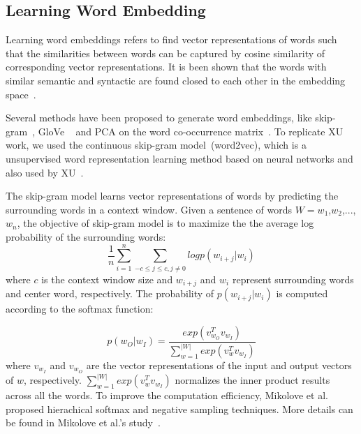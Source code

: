 \documentclass[sigconf]{acmart}
\theoremstyle{break}
\begin{document}


\subsection{Learning Word Embedding}\label{embedding}
Learning word embeddings refers to find vector representations
of words such that the similarities between words can be captured by cosine similarity of corresponding 
vector representations. It is been shown that the words with similar semantic and syntactic are found closed
to each other in the embedding space~\cite{mikolov2013distributed}.

Several methods have been proposed to generate word embeddings, 
like skip-gram~\cite{mikolov2013distributed}, GloVe ~\cite{pennington2014glove}
and PCA on the word co-occurrence matrix~\cite{lebret2013word}. To replicate XU work,
we used the continuous skip-gram model~(word2vec),  which is a unsupervised word representation learning method based on
neural networks and also used by  XU~\cite{xu2016predicting}. 

The skip-gram model learns vector representations of words
 by predicting the surrounding words in a context window. 
 Given a sentence of words $W =w_1$,$w_2$,...,$w_n$, the objective of skip-gram model is to maximize the
 the average log probability of the surrounding words:
 \begin{equation*}
 \frac{1}{n}\sum_{i=1}^{n} \sum_{-c\leq j \leq c, j \neq 0} log p(w_{i+j}|w_i)
\end{equation*}
where $c$ is the context window size and $w_{i+j}$ and $w_{i}$ represent surrounding words and center word, respectively.
The probability of $p(w_{i+j}|w_i)$ is computed according to the softmax function:

\begin{equation*}
p(w_O|w_I) = \frac{exp(v_{w_O}^Tv_{w_I})}{\sum_{w=1}^{|W|}exp(v_{w}^Tv_{w_I})}
\end{equation*}
where $v_{w_I}$ and $v_{w_O}$ are the vector representations of the input and output vectors of $w$, respectively. 
$\sum_{w=1}^{|W|}exp(v_{w}^Tv_{w_I})$  normalizes the inner product results across all the words.
To improve the computation efficiency, Mikolove et al. ~\cite{mikolov2013distributed} proposed
hierachical softmax and negative sampling
techniques. More details can be found in Mikolove et al.'s study~\cite{mikolov2013distributed}.
\end{document}
